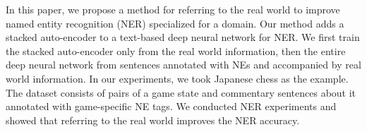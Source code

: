 In this paper, we propose a method for referring to the real world to improve named entity recognition (NER) specialized for a domain. Our method adds a stacked auto-encoder to a text-based deep neural network for NER. We first train the stacked auto-encoder only from the real world information, then the entire deep neural network from sentences annotated with NEs and accompanied by real world information. In our experiments, we took Japanese chess as the example. The dataset consists of pairs of a game state and commentary sentences about it annotated with game-specific NE tags. We conducted NER experiments and showed that referring to the real world improves the NER accuracy.
